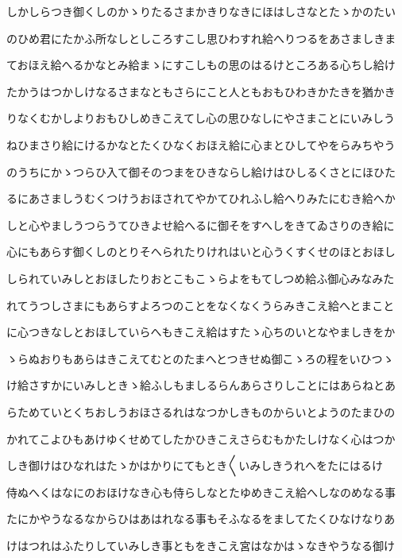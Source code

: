 \documentclass[a4paper,11pt,landscape]{ltjtarticle}
\begin{document}
\par\medskip
しかしらつき御くしのかゝりたるさまかきりなきにほはしさなとたゝかのたい
\par\medskip
のひめ君にたかふ所なしとしころすこし思ひわすれ給へりつるをあさましきま
\par\medskip
ておほえ給へるかなとみ給まゝにすこしもの思のはるけところある心ちし給け
\par\medskip
たかうはつかしけなるさまなともさらにこと人ともおもひわきかたきを猶かき
\par\medskip
りなくむかしよりおもひしめきこえてし心の思ひなしにやさまことにいみしう
\par\medskip
ねひまさり給にけるかなとたくひなくおほえ給に心まとひしてやをらみちやう
\par\medskip
のうちにかゝつらひ入て御そのつまをひきならし給けはひしるくさとにほひた
\par\medskip
るにあさましうむくつけうおほされてやかてひれふし給へりみたにむき給へか
\par\medskip
しと心やましうつらうてひきよせ給へるに御そをすへしをきてゐさりのき給に
\par\medskip
心にもあらす御くしのとりそへられたりけれはいと心うくすくせのほとおほし
\par\medskip
しられていみしとおほしたりおとこもこゝらよをもてしつめ給ふ御心みなみた
\par\medskip
れてうつしさまにもあらすよろつのことをなくなくうらみきこえ給へとまこと
\par\medskip
に心つきなしとおほしていらへもきこえ給はすたゝ心ちのいとなやましきをか
\par\medskip
ゝらぬおりもあらはきこえてむとのたまへとつきせぬ御こゝろの程をいひつゝ
\par\medskip
け給さすかにいみしときゝ給ふしもましるらんあらさりしことにはあらねとあ
\par\medskip
らためていとくちおしうおほさるれはなつかしきものからいとようのたまひの
\par\medskip
かれてこよひもあけゆくせめてしたかひきこえさらむもかたしけなく心はつか
\par\medskip
しき御けはひなれはたゝかはかりにてもとき〱いみしきうれへをたにはるけ
\par\medskip
侍ぬへくはなにのおほけなき心も侍らしなとたゆめきこえ給へしなのめなる事
\par\medskip
たにかやうなるなからひはあはれなる事もそふなるをましてたくひなけなりあ
\par\medskip
けはつれはふたりしていみしき事ともをきこえ宮はなかはゝなきやうなる御け
\end{document}
